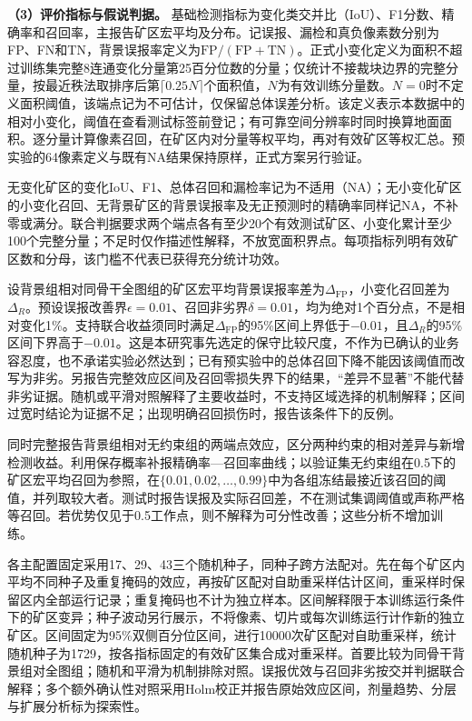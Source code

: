 \textbf{（3）评价指标与假说判据。}
基础检测指标为变化类交并比（IoU）、F1分数、精确率和召回率，主报告矿区宏平均及分布。记误报、漏检和真负像素数分别为FP、FN和TN，背景误报率定义为$\mathrm{FP}/(\mathrm{FP}+\mathrm{TN})$。正式小变化定义为面积不超过训练集完整8连通变化分量第25百分位数的分量；仅统计不接裁块边界的完整分量，按最近秩法取排序后第$\lceil0.25N\rceil$个面积值，$N$为有效训练分量数。$N=0$时不定义面积阈值，该端点记为不可估计，仅保留总体误差分析。该定义表示本数据中的相对小变化，阈值在查看测试标签前登记；有可靠空间分辨率时同时换算地面面积。逐分量计算像素召回，在矿区内对分量等权平均，再对有效矿区等权汇总。预实验的64像素定义与既有NA结果保持原样，正式方案另行验证。

无变化矿区的变化IoU、F1、总体召回和漏检率记为不适用（NA）；无小变化矿区的小变化召回、无背景矿区的背景误报率及无正预测时的精确率同样记NA，不补零或满分。联合判据要求两个端点各有至少20个有效测试矿区、小变化累计至少100个完整分量；不足时仅作描述性解释，不放宽面积界点。每项指标列明有效矿区数和分母，该门槛不代表已获得充分统计功效。

设背景组相对同骨干全图组的矿区宏平均背景误报率差为$\Delta_{\mathrm{FP}}$，小变化召回差为$\Delta_R$。预设误报改善界$\epsilon=0.01$、召回非劣界$\delta=0.01$，均为绝对1个百分点，不是相对变化1\%。支持联合收益须同时满足$\Delta_{\mathrm{FP}}$的95\%区间上界低于$-0.01$，且$\Delta_R$的95\%区间下界高于$-0.01$。这是本研究事先选定的保守比较尺度，不作为已确认的业务容忍度，也不承诺实验必然达到；已有预实验中的总体召回下降不能因该阈值而改写为非劣。另报告完整效应区间及召回零损失界下的结果，“差异不显著”不能代替非劣证据。随机或平滑对照解释了主要收益时，不支持区域选择的机制解释；区间过宽时结论为证据不足；出现明确召回损伤时，报告该条件下的反例。

同时完整报告背景组相对无约束组的两端点效应，区分两种约束的相对差异与新增检测收益。利用保存概率补报精确率—召回率曲线；以验证集无约束组在0.5下的矿区宏平均召回为参照，在$\{0.01,0.02,\ldots,0.99\}$中为各组冻结最接近该召回的阈值，并列取较大者。测试时报告误报及实际召回差，不在测试集调阈值或声称严格等召回。若优势仅见于0.5工作点，则不解释为可分性改善；这些分析不增加训练。

各主配置固定采用17、29、43三个随机种子，同种子跨方法配对。先在每个矿区内平均不同种子及重复掩码的效应，再按矿区配对自助重采样估计区间，重采样时保留区内全部运行记录；重复掩码也不计为独立样本。区间解释限于本训练运行条件下的矿区变异；种子波动另行展示，不将像素、切片或每次训练运行计作新的独立矿区。区间固定为95\%双侧百分位区间，进行10000次矿区配对自助重采样，统计随机种子为1729，按各指标固定的有效矿区集合成对重采样。首要比较为同骨干背景组对全图组；随机和平滑为机制排除对照。误报优效与召回非劣按交并判据联合解释；多个额外确认性对照采用Holm校正并报告原始效应区间，剂量趋势、分层与扩展分析标为探索性。

